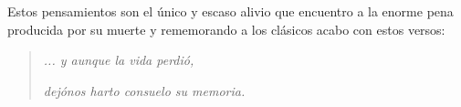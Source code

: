 Estos pensamientos  son el \'unico y escaso alivio  que encuentro a la enorme pena  producida por su muerte y rememorando a los cl\'asicos acabo con estos  versos:

\begin{quotation} 
\textit{... y aunque la vida perdi\'o,}

\textit{dej\'onos harto consuelo su memoria.}
\end{quotation}
%
%

\begin{center}
\mbox{}\\[.1ex]
\resizebox{.5\linewidth}{!}{\color{azulsema}\rule{.5\linewidth}{1pt}
{\large $\diamond$} {\huge $\diamond$} {\large $\diamond$} \rule{.5\linewidth}{1pt}}
\end{center}
